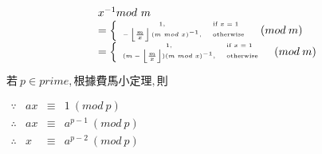 \[
    \begin{array}{l}
        x^{-1} mod \ m \\
        \begin{tiny}
            = \begin{cases}
                \begin{array}{cl}
                    1, & \text{if} \ x=1 \\
                    -\left \lfloor\frac{m}{x} \right\rfloor(m \ mod \ x)^{-1}, & \text{otherwise}
                \end{array}
            \end{cases}(mod \ m)
        \end{tiny} \\
        \begin{tiny}
            = \begin{cases}
                \begin{array}{cl}
                    1, & \text{if} \ x=1 \\
                    (m-\left \lfloor\frac{m}{x} \right\rfloor)(m \ mod \ x)^{-1}, & \text{otherwise}
                \end{array}
            \end{cases}(mod \ m)
        \end{tiny}
    \end{array}
\]

{\raggedright
    \(若 \ p \in prime, 根據費馬小定理, 則 \) \par
    \(
        \begin{array}{rrcl}
            \because & ax & \equiv & 1 \ (mod \ p) \\
            \therefore & ax & \equiv & a^{p-1} \ (mod \ p) \\
            \therefore & x & \equiv & a^{p-2} \ (mod \ p)
        \end{array}
    \) \par
}